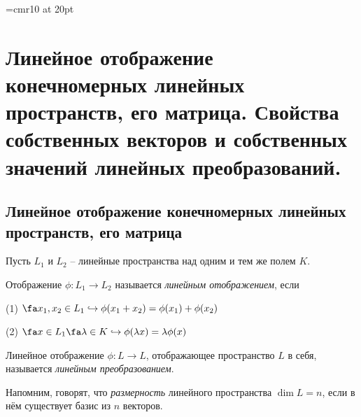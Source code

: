 \font\Large=cmr10 at 20pt
\def\fudge#1{\smash{\hbox{\Large#1}}}
\chapter[Линейное отображение конечномерных линейных прост\-ранств, его матрица. Свойства собственных векторов и собственных значений линейных преобразований.]{Линейное отображение конечномерных линейных пространств, его матрица. Свойства собственных векторов и собственных значений линейных преобразований.}
\section{Линейное отображение конечномерных линейных пространств, его матрица}
  Пусть $L_1$ и $L_2$ -- линейные пространства над одним  и тем же полем $K$.
  \begin{defn}
  Отображение $\phi: L_1\rightarrow L_2$ называется \textit{линейным отображением}, если
  
  (1) $\fa x_1,x_2 \in L_1 \hookrightarrow \phi(x_1+x_2)=\phi(x_1)+\phi(x_2)$
  
  (2) $\fa x \in L_1 \fa \lambda \in K \hookrightarrow \phi(\lambda x)=\lambda \phi(x)$
  \end{defn}
  \begin{defn}
  Линейное отображение $\phi: L\rightarrow L$, отображающее пространство $L$ в себя, называется \textit{линейным преобразованием}.
  \end{defn}
  
  Напомним, говорят, что \textit{размерность} линейного пространства $\dim L = n$, если в нём существует базис из $n$ векторов.
  
